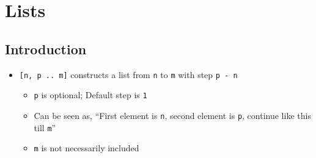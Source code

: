 
\section{Lists}
\subsection{Introduction}
\begin{itemize}
     If \verb+T+ is a type then \verb+[T]+ is a type
        \begin{itemize}
            \item Is a new type constructor
        \end{itemize}
     \verb+[] :: [T]+ is of type \verb+[T]+
     \verb+(x : xs) :: [T]+ iff \verb+x :: T+ and \verb+xs :: [T]+
        \begin{itemize}
             \verb+:+ prepends an element to a list
                \begin{itemize}
                     \verb|++| concatenates two lists
                \end{itemize}
            \item \verb+[a, b, c] = a : (b : (c : []))+ can be seen as a tree
        \end{itemize}
    \item \verb+[n, p .. m]+ constructs a list from \verb+n+ to \verb+m+ with step \verb+p - n+
        \begin{itemize}
            \item \verb+p+ is optional; Default step is \verb+1+
            \item Can be seen as, ``First element is \verb+n+, second element is \verb+p+, continue like this till \verb+m+''
            \item \verb+m+ is not necessarily included
        \end{itemize}
\end{itemize}

